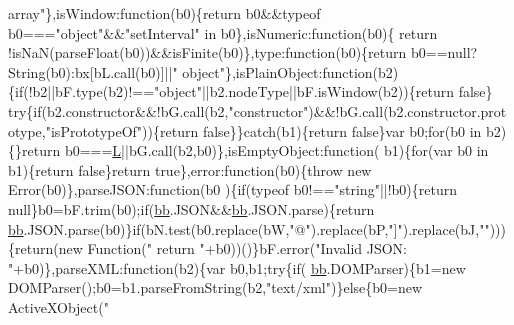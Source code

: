\begin{DoxyCode}
{      array"}\},isWindow:\textcolor{keyword}{function}(b0)\{\textcolor{keywordflow}{return} b0&&typeof b0===\textcolor{stringliteral}{"object"}&&\textcolor{stringliteral}{"setInterval"} in b0\},isNumeric:\textcolor{keyword}{function}(b0)\{\textcolor{keywordflow}{
      return} !isNaN(parseFloat(b0))&&isFinite(b0)\},type:\textcolor{keyword}{function}(b0)\{\textcolor{keywordflow}{return} b0==null?String(b0):bx[bL.call(b0)]||\textcolor{stringliteral}{"
      object"}\},isPlainObject:function(b2)\{\textcolor{keywordflow}{if}(!b2||bF.type(b2)!==\textcolor{stringliteral}{"object"}||b2.nodeType||bF.isWindow(b2))\{\textcolor{keywordflow}{return} \textcolor{keyword}{false}\}\textcolor{keywordflow}{
      try}\{\textcolor{keywordflow}{if}(b2.constructor&&!bG.call(b2,\textcolor{stringliteral}{"constructor"})&&!bG.call(b2.constructor.prototype,\textcolor{stringliteral}{"isPrototypeOf"}))\{\textcolor{keywordflow}{return} \textcolor{keyword}{
      false}\}\}\textcolor{keywordflow}{catch}(b1)\{\textcolor{keywordflow}{return} \textcolor{keyword}{false}\}var b0;\textcolor{keywordflow}{for}(b0 in b2)\{\}\textcolor{keywordflow}{return} b0===\hyperlink{a00039_a38ee4c0b5f4fe2a18d0c783af540d253}{L}||bG.call(b2,b0)\},isEmptyObject:\textcolor{keyword}{function}(
      b1)\{\textcolor{keywordflow}{for}(var b0 in b1)\{\textcolor{keywordflow}{return} \textcolor{keyword}{false}\}\textcolor{keywordflow}{return} \textcolor{keyword}{true}\},error:\textcolor{keyword}{function}(b0)\{\textcolor{keywordflow}{throw} \textcolor{keyword}{new} Error(b0)\},parseJSON:\textcolor{keyword}{function}(b0
      )\{\textcolor{keywordflow}{if}(typeof b0!==\textcolor{stringliteral}{"string"}||!b0)\{\textcolor{keywordflow}{return} null\}b0=bF.trim(b0);\textcolor{keywordflow}{if}(\hyperlink{a00039_a1d6558865876e1c8cca029fce41a4bdb}{bb}.JSON&&\hyperlink{a00039_a1d6558865876e1c8cca029fce41a4bdb}{bb}.JSON.parse)\{\textcolor{keywordflow}{return} 
      \hyperlink{a00039_a1d6558865876e1c8cca029fce41a4bdb}{bb}.JSON.parse(b0)\}\textcolor{keywordflow}{if}(bN.test(b0.replace(bW,\textcolor{stringliteral}{"@"}).replace(bP,\textcolor{stringliteral}{"]"}).replace(bJ,\textcolor{stringliteral}{""})))\{\textcolor{keywordflow}{return}(\textcolor{keyword}{new} Function(\textcolor{stringliteral}{"
      return "}+b0))()\}bF.error(\textcolor{stringliteral}{"Invalid JSON: "}+b0)\},parseXML:\textcolor{keyword}{function}(b2)\{var b0,b1;\textcolor{keywordflow}{try}\{\textcolor{keywordflow}{if}(
      \hyperlink{a00039_a1d6558865876e1c8cca029fce41a4bdb}{bb}.DOMParser)\{b1=\textcolor{keyword}{new} DOMParser();b0=b1.parseFromString(b2,\textcolor{stringliteral}{"text/xml"})\}\textcolor{keywordflow}{else}\{b0=\textcolor{keyword}{new} ActiveXObject(\textcolor{stringliteral}{"
}
\end{DoxyCode}
